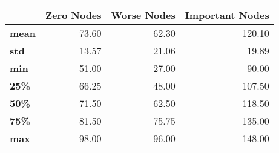 \begin{tabular}{lrrr}
\toprule
{} &  Zero Nodes &  Worse Nodes &  Important Nodes \\
\midrule
\textbf{mean} &       73.60 &        62.30 &           120.10 \\
\textbf{std } &       13.57 &        21.06 &            19.89 \\
\textbf{min } &       51.00 &        27.00 &            90.00 \\
\textbf{25\% } &       66.25 &        48.00 &           107.50 \\
\textbf{50\% } &       71.50 &        62.50 &           118.50 \\
\textbf{75\% } &       81.50 &        75.75 &           135.00 \\
\textbf{max } &       98.00 &        96.00 &           148.00 \\
\bottomrule
\end{tabular}
